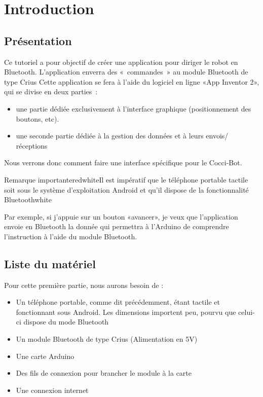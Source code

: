 
\chapter{Introduction}     

\section{Présentation}

Ce tutoriel a pour objectif de créer une application pour diriger le robot en Bluetooth.
L'application enverra des « commandes » au module Bluetooth de type Crius 
Cette application se fera à l'aide du logiciel en ligne «App Inventor 2», qui se divise en deux parties : 

\begin{itemize}
    \item une partie dédiée exclusivement à l'interface graphique
	  (positionnement des boutons, etc).
	\item une seconde partie dédiée à la gestion des données et à leurs envois/\\réceptions
\end{itemize}

\noindent
Nous verrons donc comment faire une interface spécifique pour le Cocci-Bot. \\

\begin{messageBox}{Remarque importante}{red}{white}{Il est impératif que le téléphone portable tactile soit sous le système d'exploitation Android et qu'il dispose de la fonctionnalité Bluetooth}{white}
\end{messageBox}


Par exemple, si j'appuie sur un bouton «avancer», je veux que l'application envoie en Bluetooth la donnée qui permettra à l'Arduino de comprendre l'instruction  à l'aide  du module Bluetooth.


\section{Liste du matériel}

Pour cette première partie, nous aurons besoin de : 

\begin{itemize}
    \item Un téléphone portable, comme dit précédemment, étant tactile et fonctionnant sous {\color{red} Android}. Les dimensions importent peu, pourvu que celui-ci dispose du mode Bluetooth
    \item Un module Bluetooth de type Crius (Alimentation en 5V)
    \item Une carte Arduino 
    \item Des fils de connexion pour brancher le module à la carte
    \item Une connexion internet
\end{itemize}

